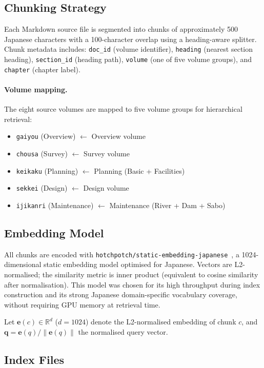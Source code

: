 \documentclass[twocolumn]{article}
\begin{document}
\subsection{Chunking Strategy}

Each Markdown source file is segmented into chunks of approximately 500 Japanese
characters with a 100-character overlap using a heading-aware splitter.
Chunk metadata includes: \texttt{doc\_id} (volume identifier),
\texttt{heading} (nearest section heading), \texttt{section\_id} (heading path),
\texttt{volume} (one of five volume groups), and \texttt{chapter} (chapter label).

\paragraph{Volume mapping.}
The eight source volumes are mapped to five volume groups for hierarchical retrieval:
\begin{itemize}
  \item \texttt{gaiyou} (Overview) $\leftarrow$ Overview volume
  \item \texttt{chousa} (Survey) $\leftarrow$ Survey volume
  \item \texttt{keikaku} (Planning) $\leftarrow$ Planning (Basic + Facilities)
  \item \texttt{sekkei} (Design) $\leftarrow$ Design volume
  \item \texttt{ijikanri} (Maintenance) $\leftarrow$ Maintenance (River + Dam + Sabo)
\end{itemize}

\subsection{Embedding Model}

All chunks are encoded with
\texttt{hotchpotch/static-embedding-japanese}~\cite{hotchpotch2024static},
a 1024-dimensional static embedding model optimised for Japanese.
Vectors are L2-normalised; the similarity metric is inner product
(equivalent to cosine similarity after normalisation).
This model was chosen for its high throughput during index construction
and its strong Japanese domain-specific vocabulary coverage,
without requiring GPU memory at retrieval time.

Let $\mathbf{e}(c) \in \mathbb{R}^{d}$ ($d=1024$) denote the L2-normalised
embedding of chunk $c$, and $\mathbf{q} = \mathbf{e}(q) / \|\mathbf{e}(q)\|$
the normalised query vector.

\subsection{Index Files}
\end{document}
